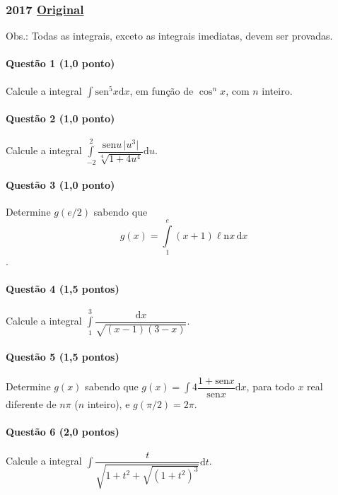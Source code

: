 \documentclass[12pt,a4paper]{article}
\newcommand{\modu}[1]{\vert #1 \vert}
\newcommand{\sen}{\mathrm{sen}}
\newcommand{\dd}{\mathrm{d}}
\newcommand{\Ln}{\ell\mathrm{n}}
\newcommand{\original}[1]{\tiny \href{#1}{Original} \normalsize}
\begin{document}
\subsubsection{2017 \original{https://drive.google.com/open?id=0ByGXcWkPZfiiR0x4U0VVU09tX1REdDFybTQxNVlKd3pEb01V}}

Obs.: Todas as integrais, exceto as integrais imediatas, devem ser provadas.

\paragraph{Questão 1 (1,0 ponto)}

Calcule a integral $\int \mathrm{sen} ^5 x \mathrm{d} x$, em função de $\cos^n x$, com $n$ inteiro.

\paragraph{Questão 2 (1,0 ponto)}

Calcule a integral $\displaystyle\int\limits_{-2}^2 \dfrac{\sen u \, \modu{u^3}}{\sqrt[4]{1+4u^4}}\dd u$.

\paragraph{Questão 3 (1,0 ponto)}

Determine $g(e/2)$ sabendo que $$g(x) = \int\limits_1^e (x+1)\Ln x\, \dd x$$.

\paragraph{Questão 4 (1,5 pontos)}

Calcule a integral $\displaystyle\int\limits_1^3 \dfrac{\dd x}{\sqrt{(x-1)(3-x)}}$.

\paragraph{Questão 5 (1,5 pontos)}

Determine $g(x)$ sabendo que $g(x) = \displaystyle\int 4\dfrac{1+\sen x}{\sen x}\dd x$, para todo $x$ real diferente de $n\pi$ ($n$ inteiro), e $g(\pi/2) = 2\pi$.

\paragraph{Questão 6 (2,0 pontos)}

Calcule a integral $\displaystyle\int \dfrac{t}{\sqrt{1+t^2+\sqrt{(1+t^2)^3}}}\dd t$.
\end{document}
